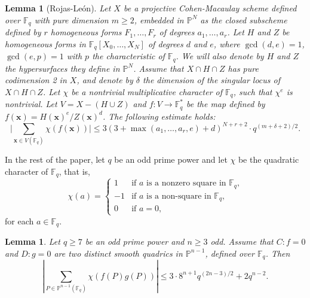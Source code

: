 \documentclass[12pt,reqno]{amsart}
\newtheorem{lem}[thm]{Lemma}
\theoremstyle{definition}
\newcommand{\F}{\mathbb{F}}
\begin{document}
\begin{lem}[Rojas-Le\'{o}n]\label{lem:RL}
 Let $X$ be a projective Cohen-Macaulay scheme defined over $\F_q$ with pure dimension $m \geq 2$, embedded in $\mathbb{P}^N$ as the closed subscheme defined by $r$ homogeneous forms $F_1, \ldots, F_r$ of degrees $a_1, \ldots, a_r$. Let $H$ and $Z$ be homogeneous forms in $\F_q\left[X_0, \ldots, X_N\right]$ of degrees $d$ and $e$, where $\gcd(d, e)=1$, $\gcd(e, p)=1$ with $p$ the characteristic of $\F_q$. We will also denote by $H$ and $Z$ the hypersurfaces they define in $\mathbb{P}^N$. Assume that $X \cap H \cap Z$ has pure codimension 2 in $X$, and denote by $\delta$ the dimension of the singular locus of $X \cap H \cap Z$. Let $\chi$ be a nontrivial multiplicative character of $\F_q$, such that $\chi^e$ is nontrivial. Let $V=X-(H \cup Z)$ and $f\colon V \rightarrow \F_q^*$ be the map defined by $f(\mathbf{x})=H(\mathbf{x})^e / Z(\mathbf{x})^d$. The following estimate holds:
$$
\bigg|\sum_{\mathbf{x} \in V(\F_q)} \chi(f(\mathbf{x}))\bigg| \leq 3(3+\max \left(a_1, \ldots, a_r, e\right)+d)^{N+r+2} \cdot q^{(m+\delta+2) / 2} .
$$   
\end{lem}

In the rest of the paper, let $q$ be an odd prime power and let $\chi$ be the quadratic character of $\F_q$, that is, 
$$
\chi(a)=\begin{cases}
1  &\text{if } a \text{ is a nonzero square in $\F_q$,} \\ 
-1 &\text{if } a \text{ is a non-square in $\F_q$,} \\ 
0 &\text{if } a=0,
\end{cases}
$$
for each $a\in\F_q$.

\begin{lem}\label{lem1}
Let $q \geq 7$ be an odd prime power and $n \geq 3$ odd. Assume that $C:f=0$ and $D:g=0$ are two distinct smooth quadrics in $\mathbb{P}^{n-1}$, defined over $\F_q$. Then
$$
\left|\sum_{P\in\mathbb{P}^{n-1}(\F_q)} \chi(f(P) g(P))\right| \leq 3\cdot 8^{n+1} q^{(2n-3)/2} +2q^{n-2}. 
$$ 
\end{lem}
\end{document}
